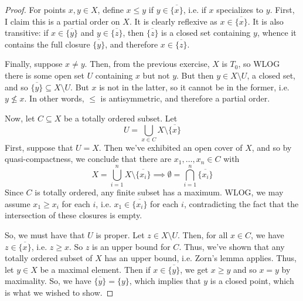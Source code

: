 \begin{proof}
	For points $x,y \in X$, define $x \leq y$ if $y \in \overline{\{x\}}$, i.e. if $x$ specializes to $y$. First, I claim this is a partial order on $X$. It is clearly reflexive as $x \in \overline{\{x\}}$. It is also transitive: if $x \in \overline{\{y\}}$ and $y \in \overline{\{z\}}$, then $\overline{\{z\}}$ is a closed set containing $y$, whence it contains the full closure $\overline{\{y\}}$, and therefore $x \in \overline{\{z\}}$.
	
	Finally, suppose $x \neq y$. Then, from the previous exercise, $X$ is $T_0$, so WLOG there is some open set $U$ containing $x$ but not $y$. But then $y \in X \setminus U$, a closed set, and so $\overline{\{y\}} \subseteq X \setminus U$. But $x$ is not in the latter, so it cannot be in the former, i.e. $y \not\leq x$. In other words, $\leq$ is antisymmetric, and therefore a partial order.
	
	Now, let $C \subseteq X$ be a totally ordered subset. Let
	\[ U = \bigcup_{x \in C} X \setminus \overline{\{x\}} \]
	First, suppose that $U = X$. Then we've exhibited an open cover of $X$, and so by quasi-compactness, we conclude that there are $x_1,\ldots,x_n \in C$ with
	\[ X = \bigcup_{i=1}^n X \setminus \overline{\{x_i\}} \implies \emptyset = \bigcap_{i=1}^n \overline{\{x_i\}} \]
	Since $C$ is totally ordered, any finite subset has a maximum. WLOG, we may assume $x_1 \geq x_i$ for each $i$, i.e. $x_1 \in \overline{\{x_i\}}$ for each $i$, contradicting the fact that the intersection of these closures is empty.
	
	So, we must have that $U$ is proper. Let $z \in X \setminus U$. Then, for all $x \in C$, we have $z \in \overline{\{x\}}$, i.e. $z \geq x$. So $z$ is an upper bound for $C$. Thus, we've shown that any totally ordered subset of $X$ has an upper bound, i.e. Zorn's lemma applies. Thus, let $y \in X$ be a maximal element. Then if $x \in \overline{\{y\}}$, we get $x \geq y$ and so $x = y$ by maximality. So, we have $\overline{\{y\}} = \{y\}$, which implies that $y$ is a closed point, which is what we wished to show.
\end{proof}
